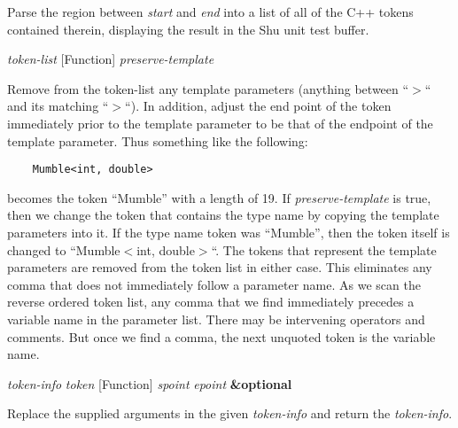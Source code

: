 \begin{doc-string}
Parse the region between \emph{start} and \emph{end} into a list of all of the C++ tokens
contained therein, displaying the result in the Shu unit test buffer.
\end{doc-string}

\vspace{1em}
\noindent
{}
\usebox{\funcname}\emph{token-list}
 \hfill [Function]
\hspace*{\wd\funcname}\emph{preserve-template}

\begin{doc-string}
Remove from the token-list any template parameters (anything between ``$>$``
and its matching ``$>$``).  In addition, adjust the end point of the token
immediately prior to the template parameter to be that of the endpoint of the
template parameter.
Thus something like the following:
\begin{verbatim}
    Mumble<int, double>
\end{verbatim}
becomes the token ``Mumble'' with a length of 19.  If \emph{preserve-template} is true,
then we change the token that contains the type name by copying the template
parameters into it.  If the type name token was ``Mumble'', then the token
itself is changed to ``Mumble$<$int, double$>$``.  The tokens that represent the
template parameters are removed from the token list in either case.
This eliminates any comma that does not immediately follow a parameter name.
As we scan the reverse ordered token list, any comma that we find immediately
precedes a variable name in the parameter list.  There may be intervening
operators and comments.  But once we find a comma, the next unquoted token is
the variable name.
\end{doc-string}

\vspace{1em}
\noindent
{}
\usebox{\funcname}\emph{token-info} \emph{token}
 \hfill [Function]
\hspace*{\wd\funcname}\emph{spoint} \emph{epoint} \textbf{\&optional}
\hspace*{\wd\funcname}

\begin{doc-string}
Replace the supplied arguments in the given \emph{token-info} and return the \emph{token-info}.
\end{doc-string}

